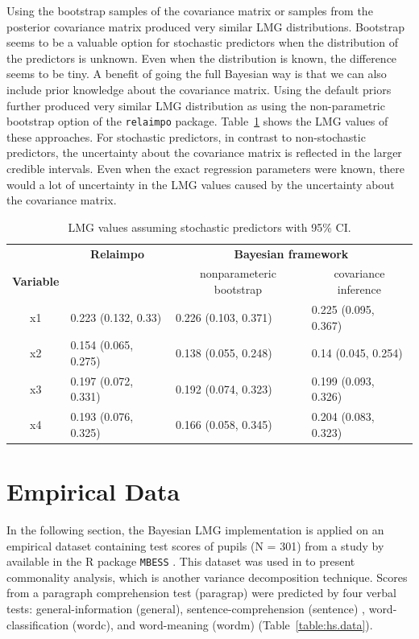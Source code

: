 \documentclass[11pt,a4paper,twoside]{book}
\begin{document}
Using the bootstrap samples of the covariance matrix or samples from the posterior covariance matrix produced  very similar LMG distributions. Bootstrap seems to be a valuable option for stochastic predictors when the distribution of the predictors is unknown. Even when the distribution is known, the difference seems to be tiny. A benefit of going the full Bayesian way is that we can also include prior knowledge about the covariance matrix. Using the default priors further produced very similar LMG distribution as using the non-parametric bootstrap option of the \texttt{relaimpo} package. Table~\ref{tbl:nonstochEx1relaimpstoch} shows the LMG values of these approaches. For stochastic predictors, in contrast to non-stochastic predictors, the uncertainty about the covariance matrix is reflected in the larger credible intervals. Even when the exact regression parameters were known, there would a lot of uncertainty in the LMG values caused by the uncertainty about the covariance matrix. 








\begin{table}[h]
\caption{LMG values assuming stochastic predictors with 95\% CI.}
\centering
\begin{tabular}{clll}
   \toprule
  & \multicolumn{1}{c}{\textbf{Relaimpo}} & \multicolumn{2}{c}{\textbf{Bayesian framework}} \\ \cmidrule(r){2-2}\cmidrule(l){3-4}
 \textbf{Variable} &  & \multicolumn{1}{c}{nonparameteric bootstrap}& \multicolumn{1}{c}{covariance inference} \\
 \midrule
x1 & 0.223 (0.132, 0.33)  & 0.226 (0.103, 0.371) &  0.225 (0.095, 0.367) \\ 
x2 & 0.154 (0.065, 0.275)  & 0.138 (0.055, 0.248)  & 0.14 (0.045, 0.254) \\ 
x3 & 0.197 (0.072, 0.331)  & 0.192 (0.074, 0.323)  & 0.199 (0.093, 0.326) \\ 
x4 & 0.193 (0.076, 0.325) & 0.166 (0.058, 0.345) & 0.204 (0.083, 0.323) \\ 
   \bottomrule
\end{tabular}
\label{tbl:nonstochEx1relaimpstoch}
\end{table}







\clearpage

\section{Empirical Data}
In the following section, the Bayesian LMG implementation is applied on an empirical dataset containing test scores of pupils (N = 301) from a study by \cite{Holzinger1939} available in the R package \texttt{MBESS} \citep{MBESS}. This dataset was used in \cite{Nimon2008} to present commonality analysis, which is another variance decomposition technique. Scores from a paragraph comprehension test (paragrap) were predicted by four verbal tests:  general-information (general),  sentence-comprehension (sentence) ,  word-classification (wordc), and  word-meaning (wordm) (Table~\ref{table:hs.data}). 
\end{document}
